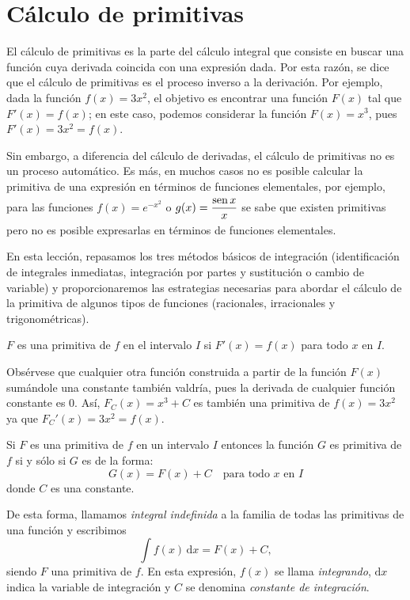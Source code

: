 \newpage
\section{Cálculo de primitivas}

El cálculo de primitivas es la parte del cálculo integral que consiste en buscar una función cuya derivada coincida con una expresión dada.
Por esta razón, se dice que el cálculo de primitivas es el proceso inverso a la derivación.
Por ejemplo, dada la función $f(x)=3x^2$, el objetivo es encontrar una función $F(x)$ tal que $F'(x)=f(x)$;
en este caso, podemos considerar la función $F(x)=x^3$, pues $F'(x)=3x^2=f(x)$.

Sin embargo, a diferencia del cálculo de derivadas, el cálculo de primitivas no es un proceso automático. Es más, en muchos casos no es posible calcular la primitiva de una expresión en términos de funciones elementales, por ejemplo, para las funciones $f(x)=e^{-x^2}$ o
$g(x)=\vphantom{\dfrac{0^0}{0_{0_0}}}
\dfrac{\operatorname{sen} x}{x}$ se sabe que existen primitivas pero no es posible expresarlas en términos de funciones elementales.

En esta lección, repasamos los tres métodos básicos de integración (identificación de integrales inmediatas, integración por partes y sustitución o cambio de variable) y proporcionaremos las estrategias necesarias para abordar el cálculo de la primitiva de algunos tipos de funciones (racionales, irracionales y trigonométricas).

%
\begin{definicion} 
$F$ es una primitiva de $f$ en el intervalo $I$ si $F'(x)=f(x)$ para todo $x$ en $I$.
\end{definicion}
%
Obsérvese que cualquier otra función construida a partir de la función $F(x)$ sumándole una constante también valdría,  pues la derivada de cualquier función constante es 0.
Así, $F_C(x)=x^3+C$ es también una primitiva de $f(x)=3x^2$ ya que $F_C'(x)=3x^2=f(x)$.
%
\begin{proposicion} 
Si $F$ es una primitiva de $f$ en un intervalo $I$ entonces la función $G$ es primitiva de $f$ si y sólo si $G$ es de la forma:
$$ G(x)=F(x)+C\quad\text{para todo }x\text{ en }I $$
donde $C$ es una constante.
\end{proposicion}

De esta forma, llamamos \emph{integral indefinida} a la familia de todas las primitivas de una función y escribimos
\[
\displaystyle\int f(x)\,\mathrm dx = F(x) + C,
\]
siendo $F$ una primitiva de $f$. En esta expresión, $f(x)$ se llama \emph{integrando}, $\mathrm dx$ indica la variable de integración y $C$ se denomina \emph{constante de integración}.

